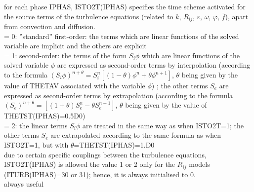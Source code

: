{for each phase IPHAS, ISTO2T(IPHAS) specifies the time scheme activated
for the source terms of the turbulence equations (related to $k$,
$R_{ij}$, $\varepsilon$, $\omega$, $\varphi$, $\overline{f}$), apart
from convection and diffusion.\\
\hspace*{1.3cm}= 0: ''standard'' first-order: the terms which are linear
functions of the solved variable are implicit and the others are explicit\\
\hspace*{1.3cm}= 1: second-order: the terms of the form $S_i\phi$ which are
linear functions of the solved variable 
$\phi$ are expressed as second-order terms by interpolation (according
to the formula
$(S_i\phi)^{n+\theta}=S_i^n[(1-\theta)\phi^n+\theta\phi^{n+1}]$, $\theta$
being given by the value of THETAV associated with the variable $\phi$)
; the other terms $S_e$ are expressed as second-order terms by
extrapolation (according to the formula
$(S_e)^{n+\theta}=[(1+\theta)S_e^n-\theta S_e^{n-1}]$, $\theta$ being
given by the value of THETST(IPHAS)=0.5D0)\\ 
\hspace*{1.3cm}= 2: the linear terms $S_i\phi$ are treated in the same
way as when ISTO2T=1;
the other terms $S_e$ are extrapolated according to the same formula
as when ISTO2T=1, but with $\theta$=THETST(IPHAS)=1.D0\\
due to certain specific couplings between the turbulence equations,
ISTO2T(IPHAS) is allowed the value 1 or 2 only for the $R_{ij}$ models
(ITURB(IPHAS)=30 or 31); hence, it is always initialised to 0.\\
always useful}


